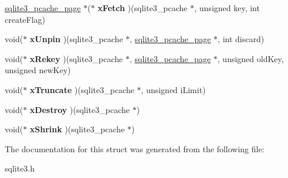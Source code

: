 \begin{DoxyCompactItemize}
\mbox{\hyperlink{structsqlite3__pcache__page}{sqlite3\+\_\+pcache\+\_\+page}} $\ast$($\ast$ {\bfseries x\+Fetch} )(sqlite3\+\_\+pcache $\ast$, unsigned key, int create\+Flag)
\item 
\mbox{\label{structsqlite3__pcache__methods2_a8fcb4ba48106aac8dfff247baea06e1a}} 
void($\ast$ {\bfseries x\+Unpin} )(sqlite3\+\_\+pcache $\ast$, \mbox{\hyperlink{structsqlite3__pcache__page}{sqlite3\+\_\+pcache\+\_\+page}} $\ast$, int discard)
\item 
\mbox{\label{structsqlite3__pcache__methods2_ad5b7609bdc0d2ae80325f7925b76c0af}} 
void($\ast$ {\bfseries x\+Rekey} )(sqlite3\+\_\+pcache $\ast$, \mbox{\hyperlink{structsqlite3__pcache__page}{sqlite3\+\_\+pcache\+\_\+page}} $\ast$, unsigned old\+Key, unsigned new\+Key)
\item 
\mbox{\label{structsqlite3__pcache__methods2_a711d60b1895622a10186a2894cef1383}} 
void($\ast$ {\bfseries x\+Truncate} )(sqlite3\+\_\+pcache $\ast$, unsigned i\+Limit)
\item 
\mbox{\label{structsqlite3__pcache__methods2_a17a43db31d015c29e44d68c752682365}} 
void($\ast$ {\bfseries x\+Destroy} )(sqlite3\+\_\+pcache $\ast$)
\item 
\mbox{\label{structsqlite3__pcache__methods2_a225971a193ff429d9f1339aca39c7755}} 
void($\ast$ {\bfseries x\+Shrink} )(sqlite3\+\_\+pcache $\ast$)
\end{DoxyCompactItemize}


The documentation for this struct was generated from the following file\+:\begin{DoxyCompactItemize}
\item 
sqlite3.\+h\end{DoxyCompactItemize}

